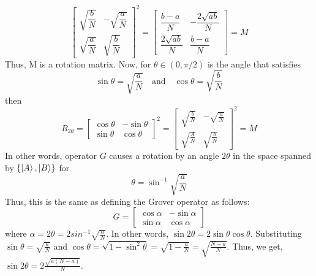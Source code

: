 \[
\begin{bmatrix} \sqrt{\dfrac{b}{N}} & -\sqrt{\dfrac{a}{N}} \\ \sqrt{\dfrac{a}{N}} & \sqrt{\dfrac{b}{N}} \end{bmatrix}^2=\begin{bmatrix} \dfrac{b-a}{N} & -\dfrac{2\sqrt{ab}}{N} \\ \dfrac{2\sqrt{ab}}{N} & \dfrac{b-a}{N} \end{bmatrix}=M
\]
Thus, M is a rotation matrix. Now, for $\theta \in (0,\pi/2)$ is the angle that satisfies
\[
\sin \theta = \sqrt{\frac{a}{N}} \quad \text{and} \quad  \cos \theta = \sqrt{\frac{b}{N}}
\]
then
\[
R_{2\theta}=\begin{bmatrix} \cos \theta &-\sin\theta \\ \sin \theta & \cos \theta \end{bmatrix}^2=\begin{bmatrix} \sqrt{\frac{b}{N}} & -\sqrt{\frac{a}{N}} \\ \sqrt{\frac{A}{N}} & \sqrt{\frac{b}{N}} \end{bmatrix}^2=M
\]
In other words, operator $G$ causes a rotation by an angle $2\theta$  in the space spanned by $\{\ket{A},\ket{B}\}$ for
\[
\theta = \sin^{-1} \sqrt{\frac{a}{N}}
\]
Thus, this is the same as defining the Grover operator as follows:
\[
G=\begin{bmatrix} \cos\alpha & -\sin \alpha \\ \sin \alpha & \cos \alpha \end{bmatrix}
\]
where $\alpha=2\theta =2sin^{-1}\sqrt{\frac{a}{N}}$. In other words, $\sin 2\theta=2\sin \theta \cos \theta$. Substituting $\sin \theta =\sqrt{\frac{a}{N}}$ and $\cos \theta = \sqrt{1-\sin^2 \theta}=\sqrt{1-\frac{a}{N}}=\sqrt{\frac{N-a}{N}}$. Thus, we get, $\sin 2\theta = 2\frac{\sqrt{a(N-a)}}{N}$.

